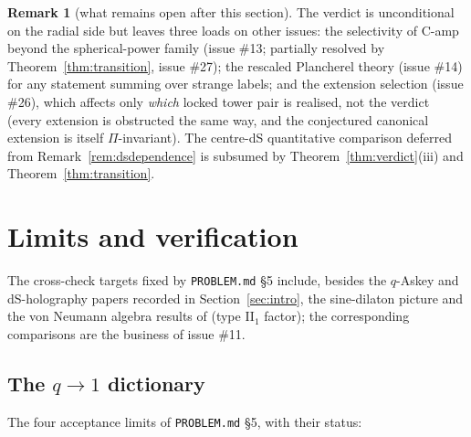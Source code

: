 \documentclass[11pt,a4paper]{article}
\theoremstyle{definition}
\newtheorem{remark}[definition]{Remark}
\theoremstyle{plain}
\begin{document}
\begin{remark}[what remains open after this section]\label{rem:criterionopen}
The verdict is unconditional on the radial side but leaves three loads on other issues:
the selectivity of C-amp beyond the spherical-power family
(issue \#13; partially resolved by Theorem~\ref{thm:transition}, issue \#27); the rescaled
Plancherel theory (issue \#14) for any statement summing over strange labels; and the
extension selection (issue \#26), which affects only \emph{which} locked tower pair is
realised, not the verdict (every extension is obstructed the same way, and the conjectured
canonical extension is itself $\Pi$-invariant). The centre-dS quantitative comparison
deferred from Remark~\ref{rem:dsdependence} is subsumed by
Theorem~\ref{thm:verdict}(iii) and Theorem~\ref{thm:transition}.
\end{remark}

\section{Limits and verification}
\label{sec:verification}


The cross-check targets fixed by \texttt{PROBLEM.md} \S5 include, besides the $q$-Askey and
dS-holography papers recorded in Section~\ref{sec:intro}, the sine-dilaton picture
\cite{Blommaert:2024sinedilaton} and the von Neumann algebra results of
\cite{Xu:2024vnalgebras} (type II$_{1}$ factor); the corresponding comparisons are the
business of issue \#11.

\subsection{The $q\to1$ dictionary}
\label{sec:q1dictionary}


The four acceptance limits of \texttt{PROBLEM.md} \S5, with their status:
\end{document}
